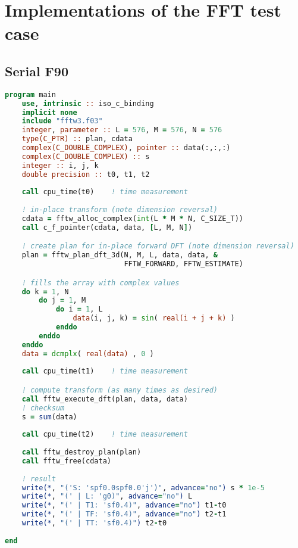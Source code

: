 %
%
%
%
%
%
%
\section{Implementations of the FFT test case}




\subsection{Serial F90}
\begin{lstlisting}[language=Fortran, caption={Serial F90 implementation of the FFT test case.}]
program main
    use, intrinsic :: iso_c_binding
    implicit none
    include "fftw3.f03"
    integer, parameter :: L = 576, M = 576, N = 576
    type(C_PTR) :: plan, cdata
    complex(C_DOUBLE_COMPLEX), pointer :: data(:,:,:)
    complex(C_DOUBLE_COMPLEX) :: s
    integer :: i, j, k
    double precision :: t0, t1, t2
    
    call cpu_time(t0)    ! time measurement
           
    ! in-place transform (note dimension reversal)
    cdata = fftw_alloc_complex(int(L * M * N, C_SIZE_T))
    call c_f_pointer(cdata, data, [L, M, N])

    ! create plan for in-place forward DFT (note dimension reversal)   
    plan = fftw_plan_dft_3d(N, M, L, data, data, &
                            FFTW_FORWARD, FFTW_ESTIMATE)

    ! fills the array with complex values
    do k = 1, N
        do j = 1, M
            do i = 1, L
                data(i, j, k) = sin( real(i + j + k) )
            enddo
        enddo
    enddo
    data = dcmplx( real(data) , 0 )
    
    call cpu_time(t1)    ! time measurement

    ! compute transform (as many times as desired)  
    call fftw_execute_dft(plan, data, data)   
    ! checksum
    s = sum(data)
    
    call cpu_time(t2)    ! time measurement
    
    call fftw_destroy_plan(plan)
    call fftw_free(cdata)
    
    ! result
    write(*, "('S: 'spf0.0spf0.0'j')", advance="no") s * 1e-5
    write(*, "(' | L: 'g0)", advance="no") L
    write(*, "(' | T1: 'sf0.4)", advance="no") t1-t0
    write(*, "(' | TF: 'sf0.4)", advance="no") t2-t1
    write(*, "(' | TT: 'sf0.4)") t2-t0
    
end
\end{lstlisting}




